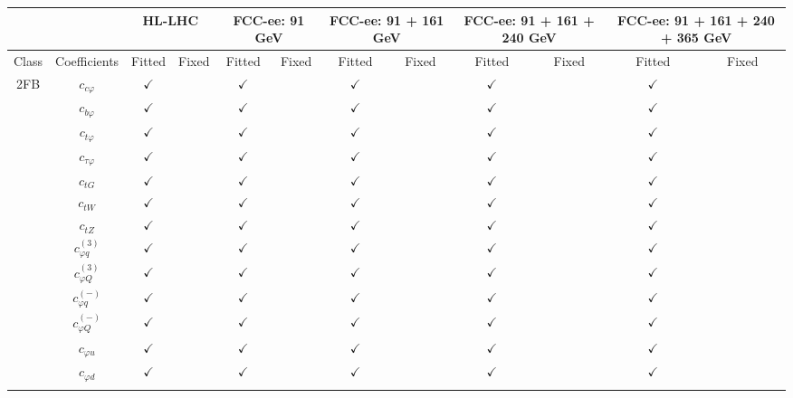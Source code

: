 \documentclass{article}
\begin{document}
\begin{table}[H]
\centering
\begin{tabular}{|c|c|c|c|c|c|c|c|c|c|c|c|}
\hline
 &  & \multicolumn{2}{c|}{HL-LHC} & \multicolumn{2}{c|}{FCC-ee: 91 GeV} & \multicolumn{2}{c|}{FCC-ee: 91 + 161 GeV} & \multicolumn{2}{c|}{FCC-ee: 91 + 161 + 240 GeV} & \multicolumn{2}{c|}{FCC-ee: 91 + 161 + 240 + 365 GeV} \\ \hline
Class & Coefficients & Fitted & Fixed  & Fitted & Fixed  & Fitted & Fixed  & Fitted & Fixed  & Fitted & Fixed  \\ \hline
\multirow{23}{*}{2FB}
 & $c_{c \varphi}$ & $\checkmark$ &  & $\checkmark$ &  & $\checkmark$ &  & $\checkmark$ &  & $\checkmark$ & \\ \cline{2-12}
 & $c_{b \varphi}$ & $\checkmark$ &  & $\checkmark$ &  & $\checkmark$ &  & $\checkmark$ &  & $\checkmark$ & \\ \cline{2-12}
 & $c_{t \varphi}$ & $\checkmark$ &  & $\checkmark$ &  & $\checkmark$ &  & $\checkmark$ &  & $\checkmark$ & \\ \cline{2-12}
 & $c_{\tau \varphi}$ & $\checkmark$ &  & $\checkmark$ &  & $\checkmark$ &  & $\checkmark$ &  & $\checkmark$ & \\ \cline{2-12}
 & $c_{tG}$ & $\checkmark$ &  & $\checkmark$ &  & $\checkmark$ &  & $\checkmark$ &  & $\checkmark$ & \\ \cline{2-12}
 & $c_{tW}$ & $\checkmark$ &  & $\checkmark$ &  & $\checkmark$ &  & $\checkmark$ &  & $\checkmark$ & \\ \cline{2-12}
 & $c_{tZ}$ & $\checkmark$ &  & $\checkmark$ &  & $\checkmark$ &  & $\checkmark$ &  & $\checkmark$ & \\ \cline{2-12}
 & $c_{\varphi q}^{(3)}$ & $\checkmark$ &  & $\checkmark$ &  & $\checkmark$ &  & $\checkmark$ &  & $\checkmark$ & \\ \cline{2-12}
 & $c_{\varphi Q}^{(3)}$ & $\checkmark$ &  & $\checkmark$ &  & $\checkmark$ &  & $\checkmark$ &  & $\checkmark$ & \\ \cline{2-12}
 & $c_{\varphi q}^{(-)}$ & $\checkmark$ &  & $\checkmark$ &  & $\checkmark$ &  & $\checkmark$ &  & $\checkmark$ & \\ \cline{2-12}
 & $c_{\varphi Q}^{(-)}$ & $\checkmark$ &  & $\checkmark$ &  & $\checkmark$ &  & $\checkmark$ &  & $\checkmark$ & \\ \cline{2-12}
 & $c_{\varphi u}$ & $\checkmark$ &  & $\checkmark$ &  & $\checkmark$ &  & $\checkmark$ &  & $\checkmark$ & \\ \cline{2-12}
 & $c_{\varphi d}$ & $\checkmark$ &  & $\checkmark$ &  & $\checkmark$ &  & $\checkmark$ &  & $\checkmark$ & \\ \cline{2-12}

\end{tabular}
\end{table}
\end{document}
